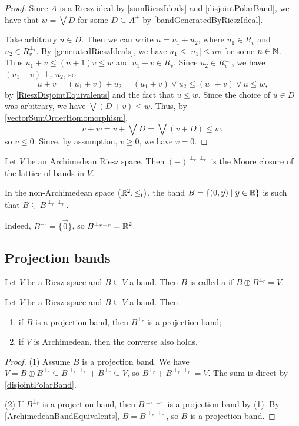 \begin{proof}
Since $A$ is a Riesz ideal by \ref{sumRieszIdeals} and \ref{disjointPolarBand}, we have that $w = \bigvee D$ for some $D\subseteq A^+$ by \ref{bandGeneratedByRieszIdeal}.

Take arbitrary $u\in D$. Then we can write $u = u_1 + u_2$, where $u_1\in R_v$ and $u_2\in R_v^{\perp_r}$. By \ref{generatedRieszIdeals}, we have $u_1 \leq |u_1| \leq nv$ for some $n\in \mathbb{N}$. Thus $u_1 + v \leq (n+1)v \leq w$ and $u_1+v\in R_v$. Since $u_2\in R_v^{\perp_r}$, we have $(u_1+v)\perp_r u_2$, so
\[ u+v = (u_1+v)+u_2 = (u_1+v)\vee u_2 \leq (u_1+v)\vee u \leq w, \]
by \ref{RieszDisjointEquivalents} and the fact that $u\leq w$. Since the choice of $u\in D$ was arbitrary, we have $\bigvee (D+v) \leq w$. Thus, by \ref{vectorSumOrderHomomorphism},
\[ v+w = v+\bigvee D = \bigvee(v+D) \leq w, \]
so $v\leq 0$. Since, by assumption, $v\geq 0$, we have $v = 0$.
\end{proof}
\begin{corollary} \label{bandClosureArchimedeanSpaces}
Let $V$ be an Archimedean Riesz space. Then $(-)^{\perp_r\perp_r}$ is the Moore closure of the lattice of bands in $V$.
\end{corollary}

\begin{example}
In the non-Archimedean space $\sSet{\R^2, \leq_l}$, the band $B = \setbuilder{(0,y)}{y\in \R}$ is such that $B \subsetneq B^{\perp_r\perp_r}$.

Indeed, $B^{\perp_r} = \{\vec{0}\}$, so $B^{\perp_r\perp_r} = \mathbb{R}^2$.
\end{example}

\subsection{Projection bands}
\begin{definition}
Let $V$ be a Riesz space and $B\subseteq V$ a band. Then $B$ is called a  if $B\oplus B^{\perp_r} = V$.
\end{definition}

\begin{lemma}
Let $V$ be a Riesz space and $B\subseteq V$ a band. Then
\begin{enumerate}
\item if $B$ is a projection band, then $B^{\perp_r}$ is a projection band;
\item if $V$ is Archimedean, then the converse also holds.
\end{enumerate}
\end{lemma}
\begin{proof}
(1) Assume $B$ is a projection band. We have $V = B\oplus B^{\perp_r} \subseteq B^{\perp_r\perp_r} + B^{\perp_r} \subseteq V$, so $B^{\perp_r} + B^{\perp_r\perp_r} = V$. The sum is direct by \ref{disjointPolarBand}.

(2) If $B^{\perp_r}$ is a projection band, then $B^{\perp_r\perp_r}$ is a projection band by (1). By \ref{ArchimedeanBandEquivalents}, $B = B^{\perp_r\perp_r}$, so $B$ is a projection band.
\end{proof}

